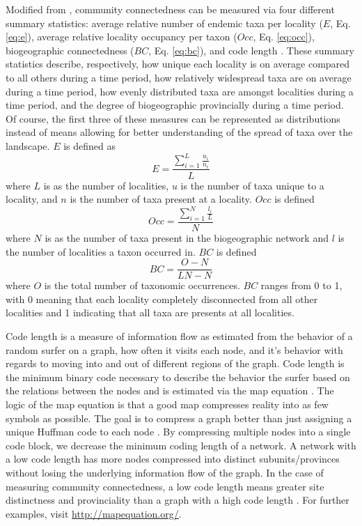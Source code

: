 \documentclass[12pt,letterpaper]{article}
\begin{document}
Modified from \citet{Sidor2013}, community connectedness can be measured via four different summary statistics: average relative number of endemic taxa per locality (\(E\), Eq. \ref{eq:e}), average relative locality occupancy per taxon (\(Occ\), Eq. \ref{eq:occ}), biogeographic connectedness (\(BC\), Eq. \ref{eq:bc}), and code length \citep{Rosvall2008,Rosvall2009a,Sidor2013}. These summary statistics describe, respectively, how unique each locality is on average compared to all others during a time period, how relatively widespread taxa are on average during a time period, how evenly distributed taxa are amongst localities during a time period, and the degree of biogeographic provincially during a time period. Of course, the first three of these measures can be represented as distributions instead of means allowing for better understanding of the spread of taxa over the landscape. 
\(E\) is defined as 
\begin{equation}
  E = \frac{\sum_{i = 1}^{L} \frac{u_{i}}{n_{i}}}{L}
  \label{eq:e}
\end{equation}
where \(L\) is as the number of localities, \(u\) is the number of taxa unique to a locality, and \(n\) is the number of taxa present at a locality. \(Occ\) is defined
\begin{equation}
  Occ = \frac{\sum_{i = 1}^{N} \frac{l_{i}}{L}}{N}
  \label{eq:occ}
\end{equation}
where \(N\) is as the number of taxa present in the biogeographic network and \(l\) is the number of localities a taxon occurred in. \(BC\) is defined 
\begin{equation}
  BC = \frac{O - N}{LN - N}
  \label{eq:bc}
\end{equation}
where \(O\) is the total number of taxonomic occurrences. \(BC\) ranges from 0 to 1, with 0 meaning that each locality completely disconnected from all other localities and 1 indicating that all taxa are presents at all localities. 

Code length is a measure of information flow \citep{Shannon1948} as estimated from the behavior of a random surfer \citep{Brin1998} on a graph, how often it visits each node, and it's behavior with regards to moving into and out of different regions of the graph. Code length is the minimum binary code necessary to describe the behavior the surfer based on the relations between the nodes and is estimated via the map equation \citep{Rosvall2008,Rosvall2009a}. The logic of the map equation is that a good map compresses reality into as few symbols as possible. The goal is to compress a graph better than just assigning a unique Huffman code to each node \citep{Huffman1952,Rosvall2008}. By compressing multiple nodes into a single code block, we decrease the minimum coding length of a network. A network with a low code length has more nodes compressed into distinct subunits/provinces without losing the underlying information flow of the graph. In the case of measuring community connectedness, a low code length means greater site distinctness and provinciality than a graph with a high code length \citep{Sidor2013}. For further examples, visit \url{http://mapequation.org/}.
\end{document}
